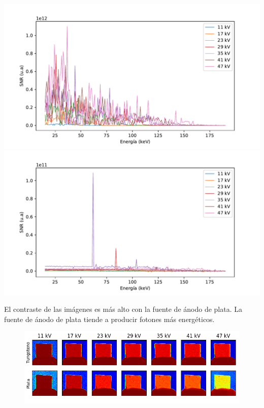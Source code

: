 \documentclass{sciposter}
\begin{document}
\begin{multicols}{3}
	\begin{table}[h]
		\centering
		\includegraphics[width = \linewidth]{Figuras/wsnr.pdf}
		\includegraphics[width = \linewidth]{Figuras/agsnr.pdf}
%			
	\end{table}
	
	El contraste de las imágenes es más alto con la fuente de ánodo de plata. La fuente de ánodo de plata tiende a producir fotones más energéticos.
	
	\begin{figure}[h]
		\centering
		\includegraphics[width = \linewidth]{Figuras/Images.png}
	\end{figure}
	

\end{multicols}
\end{document}
